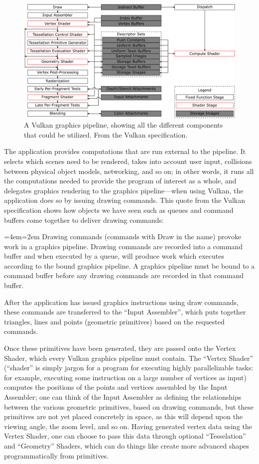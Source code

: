 \documentclass[12pt,letterpaper]{article}
\newcommand{\inquotes}[1]{``#1''}	%
\newenvironment{indenttext}{%
	\par%
	\medskip
	\leftskip=4em\rightskip=2em%
	\noindent\ignorespaces}{%
	\par\medskip}
\renewenvironment{quotation}{\begin{indenttext}\fontfamily{LinuxLibertineT-OsF}\selectfont}{\end{indenttext}}
\begin{document}
    \begin{figure}
        \centering
        \includegraphics[width=0.7\linewidth]{vulkan-gfx-pipeline}
        \caption{A Vulkan graphics pipeline, showing all the different components that could be utilized. From the Vulkan specification.}
        \label{fig:vulkan-graphics-pipeline}
    \end{figure}
    
    The application provides computations that are run external to the pipeline. It selects which scenes need to be rendered, takes into account user input, collisions between physical object models, networking, and so on; in other words, it runs all the computations needed to provide the program of interest as a whole, and delegates graphics rendering to the graphics pipeline---when using Vulkan, the application does so by issuing drawing commands. This quote from the Vulkan specification shows how objects we have seen such as queues and command buffers come together to deliver drawing commands: 
        \begin{quotation}
            Drawing commands (commands with Draw in the name) provoke work in a graphics pipeline. Drawing commands are recorded into a command buffer and when executed by a queue, will produce work which executes according to the bound graphics pipeline. A graphics pipeline must be bound to a command buffer before any drawing commands are recorded in that command buffer.
        \end{quotation}
    After the application has issued graphics instructions using draw commands, these commands are transferred to the \inquotes{Input Assembler}, which puts together triangles, lines and points (geometric primitives) based on the requested commands. 

    Once these primitives have been generated, they are passed onto the Vertex Shader, which every Vulkan graphics pipeline must contain. The \inquotes{Vertex Shader} (\inquotes{shader} is simply jargon for a program for executing highly parallelizable tasks: for example, executing some instruction on a large number of vertices as input) computes the positions of the points and vertices assembled by the Input Assembler; one can think of the Input Assembler as defining the relationships between the various geometric primitives, based on drawing commands, but these primitives are not yet placed concretely in space, as this will depend upon the viewing angle, the zoom level, and so on. Having generated vertex data using the Vertex Shader, one can choose to pass this data through optional \inquotes{Tesselation} and \inquotes{Geometry} Shaders, which can do things like create more advanced shapes programmatically from primitives. 
\end{document}
